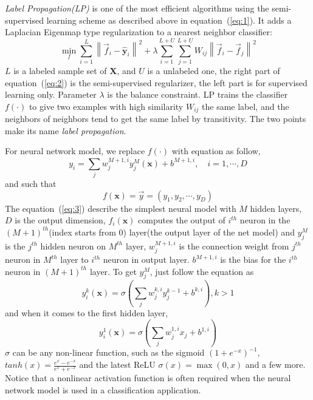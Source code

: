 \documentclass[3p,times,procedia]{elsarticle}
\begin{document}
\emph{Label Propagation(LP)}
\cite{zhu2002learning} 
is one of the most efficient algorithms using 
the semi-supervised learning scheme as 
described above in equation~(\ref{eq:1}). 
It adds a Laplacian Eigenmap type 
regularization to a nearest neighbor 
classifier:
\begin{equation}
	\min_f
	\sum^L_{i=1}
	\left\|
	\vec{f}_i-\mathbf{\hat{y}}_i
	\right\|^2 +
	\lambda
	\sum^{L+U}_{i=1}
	\sum^{L+U}_{j=1}
	W_{ij}
	\left\|
	\vec{f}_i-\vec{f}_j
	\right\|^2
	\label{eq:2}
\end{equation}
$L$ is a labeled sample set of $\mathbf{X}$, 
and $U$ is 
a unlabeled one, the right part of 
equation~(\ref{eq:2}) is the semi-supervised 
regularizer,
the left part is for supervised learning only.
Parameter $\lambda$ is the balance constraint. 
LP trains the classifier $f(\cdot)$ to give
two examples with high similarity $W_{ij}$
the same label, and the neighbors of neighbors
tend to get the same label by transitivity.
The two points make its name \emph{label
propagation}.

For neural network model,
we replace $f(\cdot)$ with equation as follow,
\begin{equation}
	y_i=\sum_j w_j^{M+1,i}y^M_j(\mathbf{x})
	+b^{M+1,i},\quad i=1,\cdots,D
\label{eq:3}
\end{equation}
and such that
\begin{equation}
	f(\mathbf{x}) = \vec{y}=
	\left(y_1,y_2,\cdots,y_D\right)
\label{eq:4}
\end{equation}
The equation~(\ref{eq:3}) describe the simplest 
neural model with $M$ hidden layers, $D$ is 
the output dimension, $f_i(\mathbf{x})$ 
computes the output of $i^{th}$ neuron in the
$(M+1)^{th}$(index starts from 0) 
layer(the output layer of the net model) 
and $y^{M}_j$ is the $j^{th}$ hidden
neuron on $M^{th}$ layer, $w^{M+1,i}_j$
is the connection weight from $j^{th}$
neuron in $M^{th}$ layer to 
$i^{th}$ neuron in output layer.
$b^{M+1,i}$ is the bias for the $i^{th}$
neuron in $(M+1)^{th}$ layer.
To get $y_j^M$, just follow the equation as
\begin{equation}
	y^k_i(\mathbf{x}) = \sigma\left(
		\sum_j w_j^{k,i}y_j^{k-1}
		+b^{k,i}
	\right),k>1
	\label{eq:5}
\end{equation}
and when it comes to the first hidden layer,
\begin{equation}
	y^1_i(\mathbf{x})=
	\sigma\left(\sum_jw_j^{1,i}x_j
	+b^{1,i}\right)
	\label{eq:6}
\end{equation}
$\sigma$ can be any non-linear function, such as
the sigmoid $\left(1+e^{-x}\right)^{-1}$, 
$tanh(x)=\frac{e^x-e^{-x}}{e^x+e^{-x}}$ and 
the latest ReLU $\sigma(x)=\max(0,x)$ and a few
more. Notice that a nonlinear activation
function is often required when the neural
network model is used in a classification
application.
\end{document}

